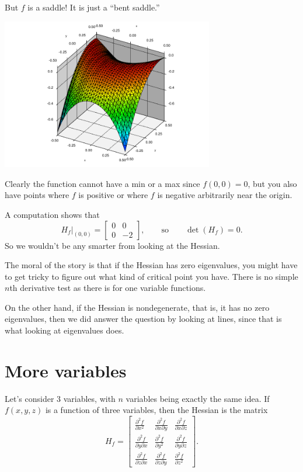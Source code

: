 \documentclass[12pt]{article}
\begin{document}
But $f$ is a saddle!  It is just a ``bent saddle.''
\begin{center}
\includegraphics[width=3.65in]{peanosurface}
\end{center}
Clearly the function cannot have a min or a max since $f(0,0)=0$, but you
also have points where $f$ is positive or where $f$ is negative arbitrarily
near the origin.

A computation shows that
$$
H_f\big|_{(0,0)} =
\begin{bmatrix}
0 & 0 \\
0 & -2
\end{bmatrix}
,
\qquad \text{so} \qquad
\det(H_f) = 0 .
$$
So we wouldn't be any smarter from looking at the Hessian.

The moral of the story is that if the Hessian has zero eigenvalues, you
might have to get tricky to figure out what kind of critical point you have.
There is no simple $n$th derivative test as there is for one variable functions.

On the other hand, if the Hessian is nondegenerate, that is, it has no
zero eigenvalues, then we did answer the question by looking at lines, since
that is what looking at eigenvalues does.

\section*{More variables}

Let's consider 3 variables, with $n$ variables being exactly the same
idea.
If $f(x,y,z)$ is a function of three variables, then
the Hessian is the matrix
\begin{equation*}
H_f
=
\begin{bmatrix}
\frac{\partial^2 f}{\partial x^2} &
\frac{\partial^2 f}{\partial x \partial y} &
\frac{\partial^2 f}{\partial x \partial z}
\\
\frac{\partial^2 f}{\partial y \partial x} &
\frac{\partial^2 f}{\partial y^2} &
\frac{\partial^2 f}{\partial y \partial z}
\\
\frac{\partial^2 f}{\partial z \partial x} &
\frac{\partial^2 f}{\partial z \partial y} &
\frac{\partial^2 f}{\partial z^2}
\end{bmatrix} .
\end{equation*}
\end{document}
